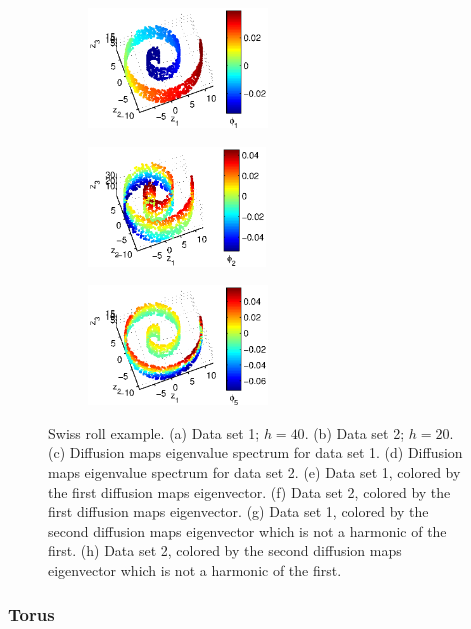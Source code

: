 \documentclass[preprint]{elsarticle}
\begin{document}
\begin{figure}[t]
\begin{subfigure}{0.45\textwidth}
\caption{}
\end{subfigure}
\hfill
\begin{subfigure}{0.45\textwidth}
\centering
\includegraphics[height=1.25in]{swissroll2_color1}
\caption{}
\end{subfigure}
\hfill
\begin{subfigure}{0.45\textwidth}
\centering
\includegraphics[height=1.25in]{swissroll1_color2}
\caption{}
\end{subfigure}
\hfill
\begin{subfigure}{0.45\textwidth}
\centering
\includegraphics[height=1.25in]{swissroll2_color2}
\caption{}
\end{subfigure}
%
\caption{Swiss roll example. (a) Data set 1; $h= 40$. (b) Data set 2; $h = 20$. (c) Diffusion maps eigenvalue spectrum for data set 1. (d) Diffusion maps eigenvalue spectrum for data set 2. (e) Data set 1, colored by the first diffusion maps eigenvector. (f) Data set 2, colored by the first diffusion maps eigenvector. (g) Data set 1, colored by the second diffusion maps eigenvector which is not a harmonic of the first. (h) Data set 2, colored by the second diffusion maps eigenvector which is not a harmonic of the first. } 
\label{fig:swiss_rolls}	
\end{figure}

\subsubsection{Torus}
\end{document}
